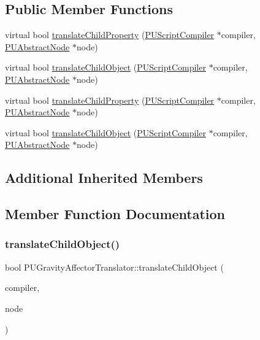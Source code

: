 \subsection*{Public Member Functions}
\begin{DoxyCompactItemize}
\item 
virtual bool \hyperlink{classPUGravityAffectorTranslator_a72855cafb35558b3bd30ce2cec93d20b}{translate\+Child\+Property} (\hyperlink{classPUScriptCompiler}{P\+U\+Script\+Compiler} $\ast$compiler, \hyperlink{classPUAbstractNode}{P\+U\+Abstract\+Node} $\ast$node)
\item 
virtual bool \hyperlink{classPUGravityAffectorTranslator_a6463aa39e2fa07db706231c45b7486b0}{translate\+Child\+Object} (\hyperlink{classPUScriptCompiler}{P\+U\+Script\+Compiler} $\ast$compiler, \hyperlink{classPUAbstractNode}{P\+U\+Abstract\+Node} $\ast$node)
\item 
virtual bool \hyperlink{classPUGravityAffectorTranslator_a910c939dc79a241c2a2699fea634bb80}{translate\+Child\+Property} (\hyperlink{classPUScriptCompiler}{P\+U\+Script\+Compiler} $\ast$compiler, \hyperlink{classPUAbstractNode}{P\+U\+Abstract\+Node} $\ast$node)
\item 
virtual bool \hyperlink{classPUGravityAffectorTranslator_a087fa3a51cd56c59ea808888a41a9e1f}{translate\+Child\+Object} (\hyperlink{classPUScriptCompiler}{P\+U\+Script\+Compiler} $\ast$compiler, \hyperlink{classPUAbstractNode}{P\+U\+Abstract\+Node} $\ast$node)
\end{DoxyCompactItemize}
\subsection*{Additional Inherited Members}


\subsection{Member Function Documentation}
\mbox{\label{classPUGravityAffectorTranslator_a6463aa39e2fa07db706231c45b7486b0}} 
\subsubsection{\texorpdfstring{translate\+Child\+Object()}{translateChildObject()}\hspace{0.1cm}{\footnotesize\ttfamily [1/2]}}
{\footnotesize\ttfamily bool P\+U\+Gravity\+Affector\+Translator\+::translate\+Child\+Object (\begin{DoxyParamCaption}\item[{\hyperlink{classPUScriptCompiler}{P\+U\+Script\+Compiler} $\ast$}]{compiler,  }\item[{\hyperlink{classPUAbstractNode}{P\+U\+Abstract\+Node} $\ast$}]{node }\end{DoxyParamCaption})\hspace{0.3cm}{\ttfamily [virtual]}}


